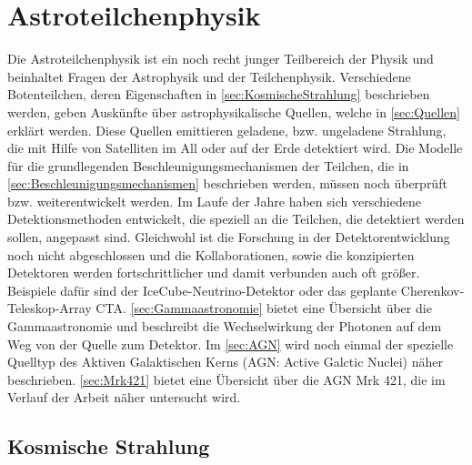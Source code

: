 \chapter{Astroteilchenphysik}
\label{chapter:Astroteilchenphysik}
Die Astroteilchenphysik ist ein noch recht junger Teilbereich der Physik und beinhaltet Fragen der Astrophysik und der Teilchenphysik.
Verschiedene Botenteilchen, deren Eigenschaften in \autoref{sec:KosmischeStrahlung} beschrieben werden, geben Auskünfte über astrophysikalische Quellen, welche in \autoref{sec:Quellen} erklärt werden.
Diese Quellen emittieren geladene, bzw.  ungeladene Strahlung, die mit Hilfe von Satelliten im All oder auf der Erde detektiert wird.
Die Modelle für die grundlegenden Beschleunigungsmechanismen der Teilchen, die in \autoref{sec:Beschleunigungsmechanismen} beschrieben werden, müssen noch überprüft bzw. weiterentwickelt werden.
Im Laufe der Jahre haben sich verschiedene Detektionsmethoden entwickelt, die speziell an die Teilchen, die detektiert werden sollen, angepasst sind.
Gleichwohl ist die Forschung in der Detektorentwicklung noch nicht abgeschlossen und die Kollaborationen, sowie die konzipierten Detektoren werden fortschrittlicher und damit verbunden auch oft größer.
Beispiele dafür sind der IceCube-Neutrino-Detektor oder das geplante Cherenkov-Teleskop-Array CTA.
\autoref{sec:Gammaastronomie} bietet eine Übersicht über die Gammaastronomie und beschreibt die Wechselwirkung der Photonen auf dem Weg von der Quelle zum Detektor. 
Im \autoref{sec:AGN} wird noch einmal der spezielle Quelltyp des Aktiven Galaktischen Kerns (AGN: Active Galctic Nuclei) näher beschrieben.
\autoref{sec:Mrk421} bietet eine Übersicht über die AGN Mrk 421, die im Verlauf der Arbeit näher untersucht wird.

\section{Kosmische Strahlung}
\label{sec:KosmischeStrahlung}

